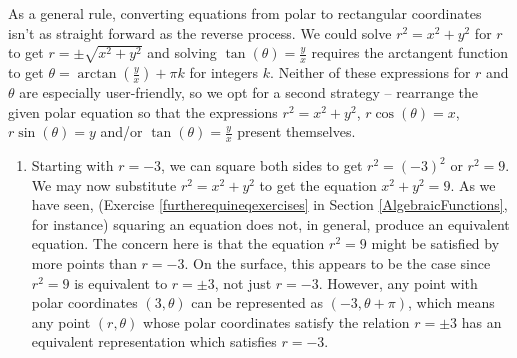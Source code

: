 {As a general rule, converting equations from polar to rectangular coordinates isn't as straight forward as the reverse process.  We could solve $r^2 = x^2 + y^2$ for $r$ to get $r = \pm \sqrt{x^2+y^2}$ and solving $\tan(\theta) = \frac{y}{x}$ requires the arctangent function to get  $\theta = \arctan\left(\frac{y}{x}\right) + \pi k$ for integers $k$.  Neither of these expressions for $r$ and $\theta$ are especially user-friendly, so we opt for a second strategy -- rearrange the given polar equation so that the expressions $r^2 = x^2+y^2$, $r\cos(\theta)=x$,  $r\sin(\theta)=y$ and/or $\tan(\theta) = \frac{y}{x}$ present themselves.

\begin{enumerate}

\item Starting with $r = -3$, we can square both sides to get  $r^2 = (-3)^2$ or $r^2 = 9$.  We may now substitute $r^2 = x^2+y^2$ to get the equation $x^2+y^2 = 9$.  As we have seen, (Exercise \ref{furtherequineqexercises} in Section \ref{AlgebraicFunctions}, for instance) squaring an equation does not, in general, produce an equivalent equation.  The concern here is that the equation $r^2 = 9$ might be satisfied by more points than $r = -3$.  On the surface, this appears to be the case since $r^2 = 9$ is equivalent to $r = \pm 3$, not just $r=-3$.  However, any point with polar coordinates $(3,\theta)$ can be represented as $(-3,\theta + \pi)$, which means any point $(r,\theta)$ whose polar coordinates satisfy the relation $r = \pm 3$ has an equivalent representation which satisfies $r=-3$.



\end{enumerate}}
